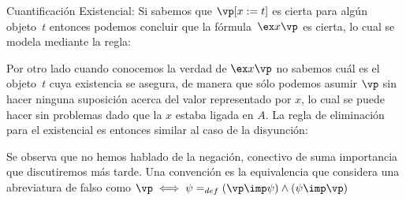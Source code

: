 \documentclass[11pt,letterpaper]{article}
\begin{document}
\item Cuantificación Existencial: Si sabemos que $\vp[x:=t]$ es cierta para 
algún objeto~$t$ entonces podemos concluir que la f\'ormula~$\ex x\vp$ es 
cierta, lo cual se modela mediante la regla:
\begin{mathpar}
\end{mathpar}
Por otro lado cuando conocemos la verdad de $\ex x\vp$ no sabemos cu\'al
es el objeto~$t$ cuya existencia se asegura, de manera que sólo podemos
asumir $\vp$ sin hacer ninguna suposición acerca del valor
representado por $x$, lo cual se puede hacer sin problemas dado que la $x$ 
estaba ligada en $A$. La regla de eliminación para el existencial es
entonces similar al caso de la disyunción:
\begin{mathpar}
\end{mathpar}
\ei

Se observa que no hemos hablado de la negación, conectivo de suma
importancia que discutiremos más tarde.
Una convenci\'on es la equivalencia que considera una abreviatura de falso como
$\vp\iff\psi  =_{def} (\vp\imp\psi) \land (\psi\imp\vp)$
\\%


\end{document}
